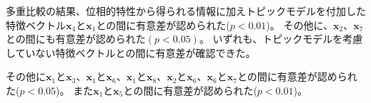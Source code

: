\documentclass[titlepage,12pt]{jreport}
\newcommand{\wa}{\cdot}
\begin{document}
%
%

多重比較の結果、位相的特性から得られる情報に加えトピックモデルを付加した特徴ベクトル$\bm{x}_4$と$\bm{x}_1$との間に有意差が認められた($p < 0.01$)。 その他に、$\bm{x}_2$、$\bm{x}_7$との間にも有意差が認められた$(p < 0.05)$。 いずれも、トピックモデルを考慮していない特徴ベクトルとの間に有意差が確認できた。

その他に$\bm{x}_1$と$\bm{x}_3$、$\bm{x}_1$と$\bm{x}_6$、$\bm{x}_1$と$\bm{x}_8$、$\bm{x}_2$と$\bm{x}_6$、$\bm{x}_6$と$\bm{x}_7$との間に有意差が認められた($p < 0.05$)。 また$\bm{x}_1$と$\bm{x}_5$との間に有意差が認められた($p < 0.01$)。
\end{document}
